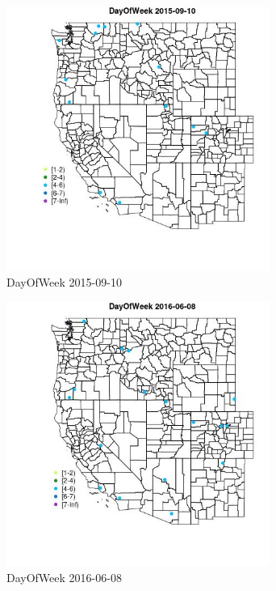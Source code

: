\begin{figure} 
\centering  
\includegraphics[width=0.77\textwidth]{Code_Outputs/Report_ML_input_PM25_Step4_part_e_de_duplicated_aves_MapObsDayOfWeek2015-09-10.jpg} 
\caption{\label{fig:Report_ML_input_PM25_Step4_part_e_de_duplicated_avesMapObsDayOfWeek2015-09-10}DayOfWeek 2015-09-10} 
\end{figure} 
 

\clearpage 

\begin{figure} 
\centering  
\includegraphics[width=0.77\textwidth]{Code_Outputs/Report_ML_input_PM25_Step4_part_e_de_duplicated_aves_MapObsDayOfWeek2016-06-08.jpg} 
\caption{\label{fig:Report_ML_input_PM25_Step4_part_e_de_duplicated_avesMapObsDayOfWeek2016-06-08}DayOfWeek 2016-06-08} 
\end{figure} 
 

